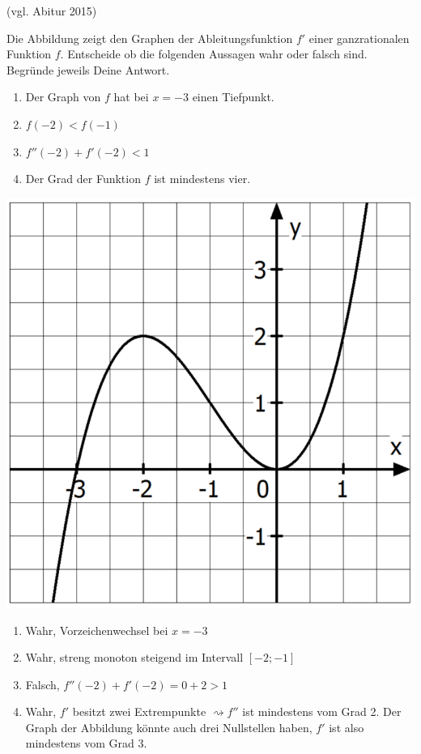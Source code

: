  (vgl. Abitur 2015)
\begin{multicols}{2}
	Die Abbildung zeigt den Graphen der Ableitungsfunktion $f'$ einer ganzrationalen Funktion $f$.
	Entscheide ob die folgenden Aussagen wahr oder falsch sind. Begründe jeweils Deine Antwort.
	\begin{enumerate}
		\item Der Graph von $f$ hat bei $x=-3$ einen Tiefpunkt.
		\item $f(-2)<f(-1)$
		\item $f''(-2)+f'(-2)<1$
		\item Der Grad der Funktion $f$ ist mindestens vier.
	\end{enumerate}
	\columnbreak

	\centering
	\includegraphics[width=0.7\linewidth]{Graphanalyse.png}
\end{multicols}

\begin{lsg}{}
	\begin{enumerate}
		\item Wahr, Vorzeichenwechsel bei $x=-3$
		\item Wahr, streng monoton steigend im Intervall $[-2;-1]$
		\item Falsch, $f''(-2)+f'(-2)=0+2>1$
		\item Wahr, $f'$ besitzt zwei Extrempunkte $\rightsquigarrow f''$ ist mindestens vom Grad 2. Der Graph der Abbildung könnte auch drei Nullstellen haben, $f'$ ist also mindestens vom Grad 3.
	\end{enumerate}
\end{lsg}




\begin{lsg}{}

\end{lsg}



